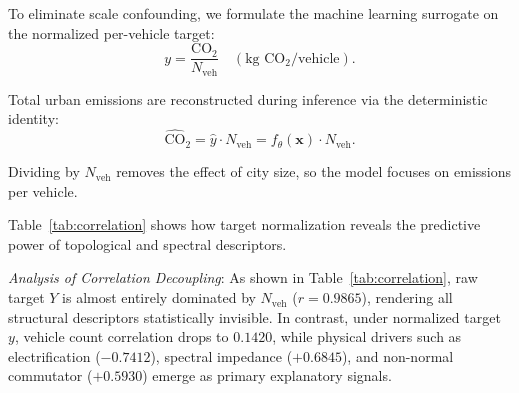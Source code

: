 \documentclass[journal]{IEEEtran}
\begin{document}
To eliminate scale confounding, we formulate the machine learning surrogate on the normalized per-vehicle target:
\begin{equation}
y = \frac{\text{CO}_2}{N_{\text{veh}}} \quad (\text{kg } \text{CO}_2 / \text{vehicle}).
\label{eq:normalized_target}
\end{equation}

Total urban emissions are reconstructed during inference via the deterministic identity:
\begin{equation}
\widehat{\text{CO}}_2 = \hat{y} \cdot N_{\text{veh}} = f_\theta(\mathbf{x}) \cdot N_{\text{veh}}.
\label{eq:reconstructed_target}
\end{equation}

Dividing by $N_{\text{veh}}$ removes the effect of city size, so the model focuses on emissions per vehicle.

Table~\ref{tab:correlation} shows how target normalization reveals the predictive power of topological and spectral descriptors.

\begin{table}[htbp]
\caption{Statistical Correlation of Top Descriptors with Normalized ($y$) vs. Raw Total ($Y$) Emissions}
\label{tab:correlation}
\centering
{}
\end{table}

\textit{Analysis of Correlation Decoupling}:
As shown in Table~\ref{tab:correlation}, raw target $Y$ is almost entirely dominated by $N_{\text{veh}}$ ($r = 0.9865$), rendering all structural descriptors statistically invisible. In contrast, under normalized target $y$, vehicle count correlation drops to $0.1420$, while physical drivers such as electrification ($-0.7412$), spectral impedance ($+0.6845$), and non-normal commutator ($+0.5930$) emerge as primary explanatory signals.
\end{document}
